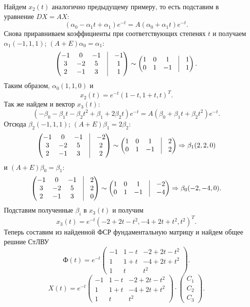 \documentclass[a4paper, 12pt]{article}
\newcommand{\FI}{\text{Ф}}
\begin{document}
Найдем $x_2(t)$ аналогично предыдущему примеру, то есть подставим в уравнение $DX = AX$:
$$(\alpha_0 - \alpha_1t + \alpha_1)e^{-t} = A(\alpha_0 +\alpha_1t)e^{-t}.$$
Снова приравниваем коэффициенты при соответствующих степенях $t$ и получаем $\alpha_1(-1, 1, 1)$; $(A+E)\alpha_0 = \alpha_1$:
$$\begin{pmatrix}
	-1 & 0 & -1 & \vline & -1\\
	3 & -2 & 5 & \vline & 1\\
	2 & -1 & 3 & \vline & 1
\end{pmatrix}\sim \begin{pmatrix}
1 & 0 & 1 & \vline & 1\\
0 & 1 & -1 & \vline & 1
\end{pmatrix}.$$
Таким образом, $\alpha_0(1,1,0)$ и $$x_2(t)=e^{-t}(1-t, 1+t, t)^T.$$
Так же найдем и вектор $x_3(t)$:
$$(-\beta_0 - \beta_1 t - \beta_2 t^2 + \beta_1 + 2\beta_2t)e^{-t} = A(\beta_0 + \beta_1t + \beta_2t^2)e^{-t}.$$
Отсюда $\beta_2(-1, 1, 1)$; $(A+E)\beta_1 = 2\beta_2$:
$$\begin{pmatrix}
	-1 & 0 & -1 & \vline & -2\\
	3 & -2 & 5 & \vline & 2\\
	2 & -1 & 3 & \vline & 2
\end{pmatrix}\sim \begin{pmatrix}
	1 & 0 & 1 & \vline & 2\\
	0 & 1 & -1 & \vline & 2
\end{pmatrix}\Rightarrow \beta_1(2,2,0)$$ и $(A+E)\beta_0 = \beta_1$:  $$\begin{pmatrix}
-1 & 0 & -1 & \vline & 2\\
3 & -2 & 5 & \vline & 2\\
2 & -1 & 3 & \vline & 0
\end{pmatrix}\sim \begin{pmatrix}
1 & 0 & 1 & \vline & -2\\
0 & 1 & -1 & \vline & -4
\end{pmatrix}\Rightarrow \beta_0(-2,-4,0).$$
Подставим полученные $\beta_i$ в $x_3(t)$ и получим $$x_3(t) = e^{-t}(-2+2t-t^2, -4+2t+t^2, t^2)^T.$$
Теперь составим из найденной ФСР фундаментальную матрицу и найдем общее решние СтЛВУ
$$\FI(t) = e^{-t}\begin{pmatrix}
	-1 & 1-t & -2+2t-t^2\\
	1& 1+t & -4 + 2t + t^2\\
	1 & t & t^2
\end{pmatrix}.$$
$$X(t) = e^{-t}\begin{pmatrix}
	-1 & 1-t & -2+2t-t^2\\
	1& 1+t & -4 + 2t + t^2\\
	1 & t & t^2
\end{pmatrix} \cdot \begin{pmatrix}
C_1\\C_2\\C_3
\end{pmatrix}.$$
\end{document}

